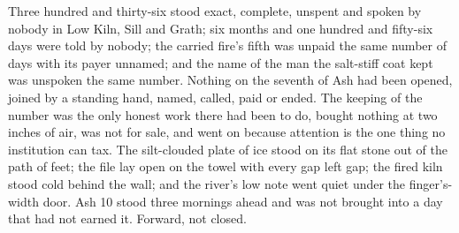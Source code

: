 Three hundred and thirty-six stood exact, complete, unspent and spoken by nobody in Low Kiln, Sill and Grath; six months and one hundred and fifty-six days were told by nobody; the carried fire's fifth was unpaid the same number of days with its payer unnamed; and the name of the man the salt-stiff coat kept was unspoken the same number. Nothing on the seventh of Ash had been opened, joined by a standing hand, named, called, paid or ended. The keeping of the number was the only honest work there had been to do, bought nothing at two inches of air, was not for sale, and went on because attention is the one thing no institution can tax. The silt-clouded plate of ice stood on its flat stone out of the path of feet; the file lay open on the towel with every gap left gap; the fired kiln stood cold behind the wall; and the river's low note went quiet under the finger's-width door. Ash 10 stood three mornings ahead and was not brought into a day that had not earned it. Forward, not closed.

